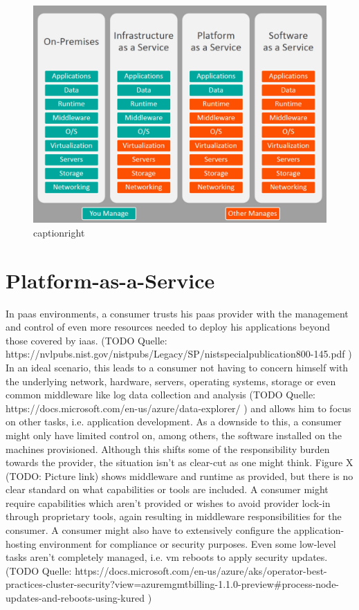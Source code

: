 \begin{figure}[H]
\includegraphics[scale=0.4]{pictures/ServiceComparison.jpg} 
\caption{captionright\protect\footnotemark}
\label{fig:servicecomparison}
\end{figure}


\section{Platform-as-a-Service}

In \gls{paas} environments, a consumer trusts his \gls{paas} provider with the management and control of even more resources needed to deploy his applications beyond those covered by \gls{iaas}. 
(TODO Quelle: https://nvlpubs.nist.gov/nistpubs/Legacy/SP/nistspecialpublication800-145.pdf )
In an ideal scenario, this leads to a consumer not having to concern himself with the underlying network, hardware, servers, operating systems, storage or even common middleware like log data collection and analysis 
(TODO Quelle: https://docs.microsoft.com/en-us/azure/data-explorer/ )
 and allows him to focus on other tasks, i.e. application development. As a downside to this, a consumer might only have limited control on, among others, the software installed on the  machines provisioned. 
Although this shifts some of the responsibility burden towards the provider, the situation isn't as clear-cut as one might think. 
Figure X  (TODO: Picture link) shows middleware and runtime as provided, but there is no clear standard on what capabilities or tools are included.
A consumer might require capabilities which aren't provided or wishes to avoid provider lock-in through proprietary tools, again resulting in middleware responsibilities for the consumer. 
A consumer might also have to extensively configure the application-hosting environment for compliance or security purposes. 
Even some low-level tasks aren't completely managed, i.e. \gls{vm} reboots to apply security updates. 
(TODO Quelle: https://docs.microsoft.com/en-us/azure/aks/operator-best-practices-cluster-security?view=azuremgmtbilling-1.1.0-preview\#process-node-updates-and-reboots-using-kured )


